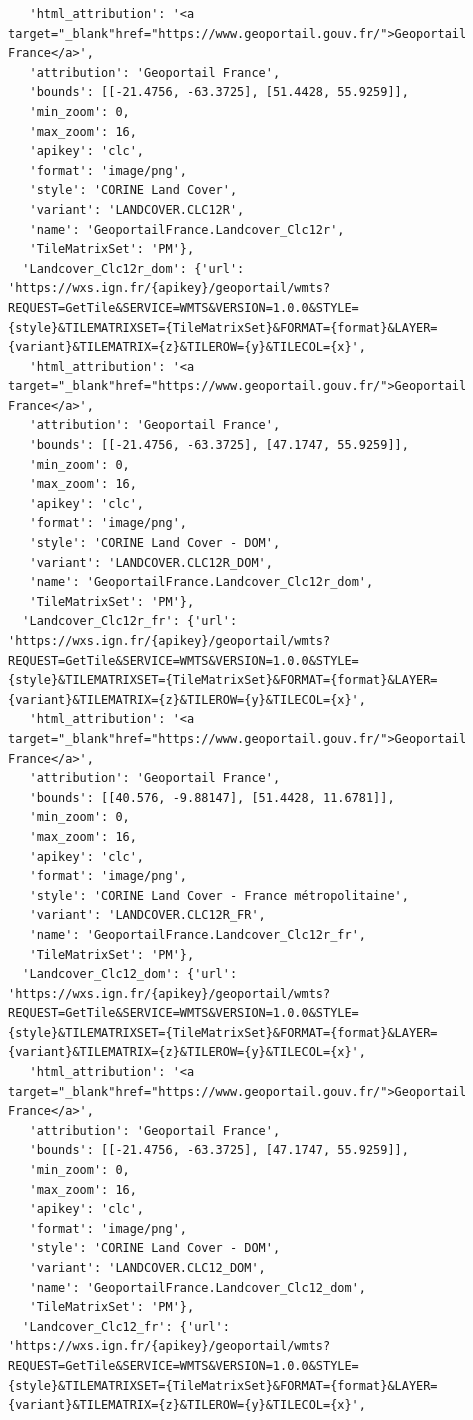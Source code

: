 \documentclass[
  letterpaper,
  DIV=11,
  numbers=noendperiod]{scrreprt}
\begin{document}
\begin{verbatim}
   'html_attribution': '<a target="_blank"href="https://www.geoportail.gouv.fr/">Geoportail France</a>',
   'attribution': 'Geoportail France',
   'bounds': [[-21.4756, -63.3725], [51.4428, 55.9259]],
   'min_zoom': 0,
   'max_zoom': 16,
   'apikey': 'clc',
   'format': 'image/png',
   'style': 'CORINE Land Cover',
   'variant': 'LANDCOVER.CLC12R',
   'name': 'GeoportailFrance.Landcover_Clc12r',
   'TileMatrixSet': 'PM'},
  'Landcover_Clc12r_dom': {'url': 'https://wxs.ign.fr/{apikey}/geoportail/wmts?REQUEST=GetTile&SERVICE=WMTS&VERSION=1.0.0&STYLE={style}&TILEMATRIXSET={TileMatrixSet}&FORMAT={format}&LAYER={variant}&TILEMATRIX={z}&TILEROW={y}&TILECOL={x}',
   'html_attribution': '<a target="_blank"href="https://www.geoportail.gouv.fr/">Geoportail France</a>',
   'attribution': 'Geoportail France',
   'bounds': [[-21.4756, -63.3725], [47.1747, 55.9259]],
   'min_zoom': 0,
   'max_zoom': 16,
   'apikey': 'clc',
   'format': 'image/png',
   'style': 'CORINE Land Cover - DOM',
   'variant': 'LANDCOVER.CLC12R_DOM',
   'name': 'GeoportailFrance.Landcover_Clc12r_dom',
   'TileMatrixSet': 'PM'},
  'Landcover_Clc12r_fr': {'url': 'https://wxs.ign.fr/{apikey}/geoportail/wmts?REQUEST=GetTile&SERVICE=WMTS&VERSION=1.0.0&STYLE={style}&TILEMATRIXSET={TileMatrixSet}&FORMAT={format}&LAYER={variant}&TILEMATRIX={z}&TILEROW={y}&TILECOL={x}',
   'html_attribution': '<a target="_blank"href="https://www.geoportail.gouv.fr/">Geoportail France</a>',
   'attribution': 'Geoportail France',
   'bounds': [[40.576, -9.88147], [51.4428, 11.6781]],
   'min_zoom': 0,
   'max_zoom': 16,
   'apikey': 'clc',
   'format': 'image/png',
   'style': 'CORINE Land Cover - France métropolitaine',
   'variant': 'LANDCOVER.CLC12R_FR',
   'name': 'GeoportailFrance.Landcover_Clc12r_fr',
   'TileMatrixSet': 'PM'},
  'Landcover_Clc12_dom': {'url': 'https://wxs.ign.fr/{apikey}/geoportail/wmts?REQUEST=GetTile&SERVICE=WMTS&VERSION=1.0.0&STYLE={style}&TILEMATRIXSET={TileMatrixSet}&FORMAT={format}&LAYER={variant}&TILEMATRIX={z}&TILEROW={y}&TILECOL={x}',
   'html_attribution': '<a target="_blank"href="https://www.geoportail.gouv.fr/">Geoportail France</a>',
   'attribution': 'Geoportail France',
   'bounds': [[-21.4756, -63.3725], [47.1747, 55.9259]],
   'min_zoom': 0,
   'max_zoom': 16,
   'apikey': 'clc',
   'format': 'image/png',
   'style': 'CORINE Land Cover - DOM',
   'variant': 'LANDCOVER.CLC12_DOM',
   'name': 'GeoportailFrance.Landcover_Clc12_dom',
   'TileMatrixSet': 'PM'},
  'Landcover_Clc12_fr': {'url': 'https://wxs.ign.fr/{apikey}/geoportail/wmts?REQUEST=GetTile&SERVICE=WMTS&VERSION=1.0.0&STYLE={style}&TILEMATRIXSET={TileMatrixSet}&FORMAT={format}&LAYER={variant}&TILEMATRIX={z}&TILEROW={y}&TILECOL={x}',

\end{verbatim}
\end{document}
